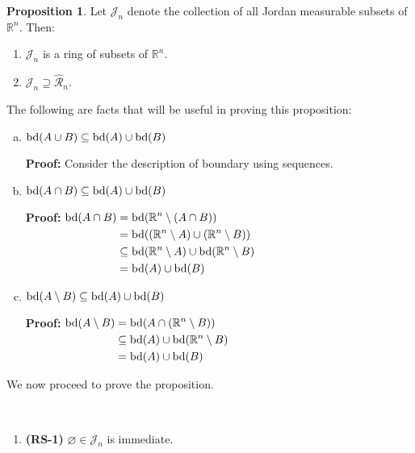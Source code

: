\documentclass[11pt]{article}
\makeatletter
\theoremstyle{definition}
\newtheorem{prop}[thm]{Proposition}
\newcommand{\R}{\ensuremath{\mathbb{R}}}
\newenvironment{pf}[1][\proofname]{\par
  \pushQED{\qed}%
  \normalfont \topsep0\p@\relax
  \trivlist
  \item[\hskip\labelsep\itshape
  #1\@addpunct{.}]\ignorespaces
}{%
  \popQED\endtrivlist\@endpefalse
}
\makeatother
\begin{document}
\begin{prop}
Let $\mathcal{J}_n$ denote the collection of all Jordan measurable subsets of $\R^n$. Then:\vspace{-1.5ex}
\begin{enumerate}[(1)]
\item $\mathcal{J}_n$ is a ring of subsets of $\R^n$.
\item $\mathcal{J}_n \supseteq \widehat{\mathcal{R}}_n.$
\end{enumerate}
\vspace{-1.5ex}
The following are facts that will be useful in proving this proposition:\vspace{-1.5ex}
\begin{enumerate}[(a)]
\item ${\rm bd}(A \cup B) \subseteq {\rm bd}(A) \cup {\rm bd}(B)$

{\bf Proof:} Consider the description of boundary using sequences.
\item ${\rm bd}(A \cap B) \subseteq {\rm bd}(A) \cup {\rm bd}(B)$

{\bf Proof:} \hfill$\begin{aligned}[t]
    {\rm bd}(A \cap B) &= {\rm bd}(\R^n \setminus (A \cap B)) \\
    &= {\rm bd}((\R^n \setminus  A) \cup (\R^n \setminus B)) \\
    &\subseteq {\rm bd}(\R^n \setminus A) \cup {\rm bd}(\R^n \setminus B) \\
    &= {\rm bd}(A) \cup {\rm bd}(B)
\end{aligned}$\hfill\null
\item ${\rm bd}(A \setminus B) \subseteq {\rm bd}(A) \cup {\rm bd}(B)$

{\bf Proof:} \hfill$\begin{aligned}[t]
    {\rm bd}(A \setminus B) &= {\rm bd}(A \cap (\R^n \setminus B)) \\
    &\subseteq {\rm bd}(A) \cup {\rm bd}(\R^n \setminus B) \\
    &= {\rm bd}(A) \cup {\rm bd}(B)
\end{aligned}$\hfill\null
\end{enumerate}
\vspace{-1.5ex}
We now proceed to prove the proposition.
\begin{pf}~\vspace{-1.5ex}
\begin{enumerate}[(1)]
\item {\bf (RS-1)} $\varnothing \in \mathcal{J}_n$ is immediate.


\end{enumerate}
\end{pf}
\end{prop}
\end{document}
